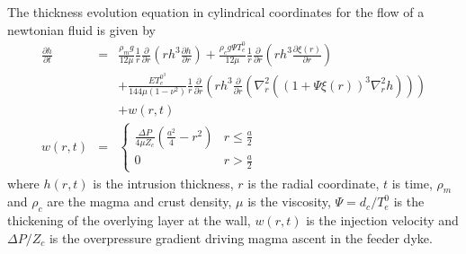 The thickness  evolution equation  in cylindrical coordinates  for the
flow of a newtonian fluid is given by \citep{Thorey:2014cv}
\begin{eqnarray}
  \frac{\partial         h}{\partial        t}
  &=&\frac{\rho_{m}g}{12  \mu} \frac{1}{r}  \frac{\partial}{\partial
      r}\left   (r  h^{3}   \frac{\partial  h}{\partial   r}  \right)+
      \frac{\rho_{c}g\Psi       T_{e}^0}{12       \mu}       \frac{1}{r}
      \frac{\partial}{\partial r}\left ( r
      h^{3}  \frac{\partial  \xi(r)}{\partial  r}\right )  \nonumber  \\
  &&+ \frac{E T_{e}^{0^{3}}}{144\mu
     (1-\nu^{2})}\frac{1}{r}\frac{\partial}{\partial  r}\left  (  r
     h^{3}    \frac{\partial}{\partial   r}    \left(\nabla^{2}_{r}
     ((1+\Psi \xi(r))^{3}\nabla^{2}_{r}h )\right)\right )\nonumber\\
  && + w(r,t)
     \label{eq16}\\
  w(r,t)&=&
            \begin{cases} \frac{ \Delta P}{4 \mu Z_{c}} (\frac{a^{2}}{4}-r^{2})&
              r \le \frac{a}{2}\\ 0 & r > \frac{a}{2}
            \end{cases}
                                      \label{eq12}
\end{eqnarray}
where  $h(r,t)$  is  the  intrusion   thickness,  $r$  is  the  radial
coordinate, $t$ is time, $\rho_m$ and $\rho_c$ are the magma and crust
density, $\mu$ is the viscosity,  $\Psi = d_c/T_e^0$ is the thickening
of the overlying layer at the wall, $w(r,t)$ is the injection velocity
and $\Delta P/Z_c$  is the overpressure gradient  driving magma ascent
in the feeder dyke.

